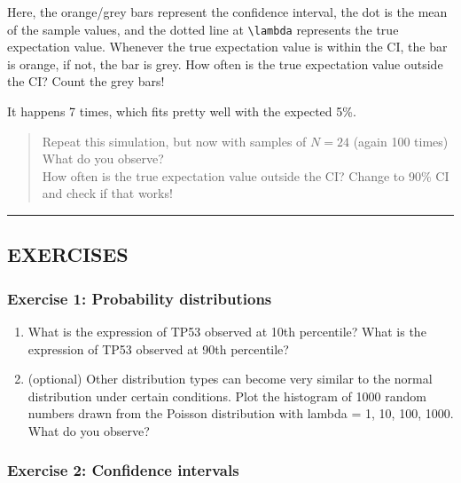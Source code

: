 \documentclass[
]{book}
\begin{document}
Here, the orange/grey bars represent the confidence interval, the dot is the mean of the sample values, and the dotted line at \texttt{\textbackslash{}lambda} represents the true expectation value. Whenever the true expectation value is within the CI, the bar is orange, if not, the bar is grey. How often is the true expectation value outside the CI? Count the grey bars!

It happens 7 times, which fits pretty well with the expected 5\%.

\begin{quote}
Repeat this simulation, but now with samples of \(N=24\) (again 100 times)\\
What do you observe?\\
How often is the true expectation value outside the CI? Change to 90\% CI and check if that works!
\end{quote}

\begin{center}\rule{0.5\linewidth}{0.5pt}\end{center}

\hypertarget{exercises-2}{%
\subsection{EXERCISES}\label{exercises-2}}

\hypertarget{exercise-1-probability-distributions}{%
\subsubsection{Exercise 1: Probability distributions}\label{exercise-1-probability-distributions}}

\begin{enumerate}
\def\labelenumi{\arabic{enumi}.}
\item
  What is the expression of TP53 observed at 10th percentile? What is the expression of TP53 observed at 90th percentile?
\item
  (optional) Other distribution types can become very similar to the normal distribution under certain conditions. Plot the histogram of 1000 random numbers drawn from the Poisson distribution with lambda = 1, 10, 100, 1000. What do you observe?
\end{enumerate}

\hypertarget{exercise-2-confidence-intervals}{%
\subsubsection{Exercise 2: Confidence intervals}\label{exercise-2-confidence-intervals}}
\end{document}
